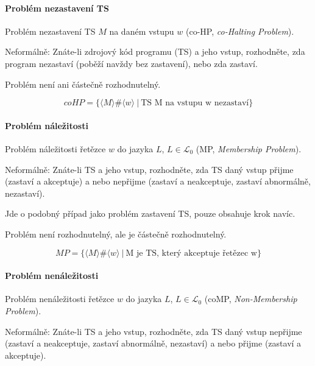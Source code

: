 \paragraph*{Problém nezastavení TS} \begin{compactitem}
    \item Problém nezastavení TS $M$ na daném vstupu $w$ (co-HP, \textit{co-Halting Problem}).

    \item Neformálně: Znáte-li zdrojový kód programu (TS) a jeho vstup, rozhodněte, zda program nezastaví (poběží navždy bez zastavení), nebo zda zastaví.

    \item Problém není ani částečně rozhodnutelný.
\end{compactitem}

$$ coHP = \{ \langle M \rangle \# \langle w \rangle ~|~ \text{TS M na vstupu w nezastaví} \} $$

\paragraph*{Problém náležitosti} \begin{compactitem}
    \item Problém náležitosti řetězce $w$ do jazyka $L$, $L \in \mathcal{L}_0$ (MP, \textit{Membership Problem}).

    \item Neformálně: Znáte-li TS a jeho vstup, rozhodněte, zda TS daný vstup přijme (zastaví a akceptuje) a nebo nepřijme (zastaví a neakceptuje, zastaví abnormálně, nezastaví). \begin{compactitem}
        \item Jde o podobný případ jako problém zastavení TS, pouze obsahuje krok navíc.
    \end{compactitem}

    \item Problém není rozhodnutelný, ale je částečně rozhodnutelný.
\end{compactitem}

$$ MP = \{ \langle M \rangle \# \langle w \rangle ~|~ \text{M je TS, který akceptuje řetězec w} \} $$

\paragraph*{Problém nenáležitosti} \begin{compactitem}
    \item Problém nenáležitosti řetězce $w$ do jazyka $L$, $L \in \mathcal{L}_0$ (coMP, \textit{Non-Membership Problem}).

    \item Neformálně: Znáte-li TS a jeho vstup, rozhodněte, zda TS daný vstup nepřijme (zastaví a neakceptuje, zastaví abnormálně, nezastaví) a nebo přijme (zastaví a akceptuje).

    \item {}
\end{compactitem}

